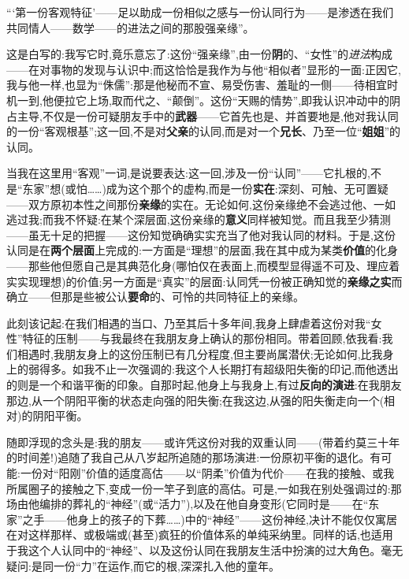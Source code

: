 “‘第一份客观特征’——足以助成一份相似之感与一份认同行为——是渗透在我们共同情人——数学——的进法之间的那股强亲缘”。

这是白写的:我写它时,竟乐意忘了:这份“强亲缘”,由一份\textbf{阴}的、“女性”的\emph{进法}构成——在对事物的发现与认识中;而这恰恰是我作为与他“相似者”显形的一面:正因它,我与他一样,也显为“侏儒”:那是他秘而不宣、易受伤害、羞耻的一侧——待相宜时机一到,他便拉它上场,取而代之、“颠倒”。这份“天赐的情势”,即我认识冲动中的阴占主导,不仅是一份可疑朋友手中的\textbf{武器}——它首先也是、并首要地是,他对我认同的一份“客观根基”;这一回,不是对\textbf{父亲}的认同,而是对一个\textbf{兄长}、乃至一位“\textbf{姐姐}”的认同。

当我在这里用“客观”一词,是说要表达:这一回,涉及一份“认同”——它扎根的,不是“东家”想(或怕……)成为这个那个的虚构,而是一份\textbf{实在}:深刻、可触、无可置疑——双方原初本性之间那份\textbf{亲缘}的实在。无论如何,这份亲缘绝不会逃过他、一如逃过我;而我不怀疑:在某个深层面,这份亲缘的\textbf{意义}同样被知觉。而且我至少猜测——虽无十足的把握——这份知觉确确实实充当了他对我认同的材料。于是,这份认同是在\textbf{两个层面}上完成的:一方面是“理想”的层面,我在其中成为某类\textbf{价值}的化身——那些他但愿自己是其典范化身(哪怕仅在表面上,而模型显得遥不可及、理应着实实现理想)的价值;另一方面是“真实”的层面:认同凭一份被正确知觉的\textbf{亲缘之实}而确立——但那是些被公认\textbf{要命}的、可怜的共同特征上的亲缘\dmark{}。

此刻该记起:在我们相遇的当口、乃至其后十多年间,我身上肆虐着这份对我“女性”特征的压制——与我最终在我朋友身上确认的那份相同。带着回顾,依我看:我们相遇时,我朋友身上的这份压制已有几分程度,但主要尚属潜伏;无论如何,比我身上的弱得多。如我不止一次强调的:我这个人长期打有超级阳失衡的印记,而他透出的则是一个和谐平衡的印象。自那时起,他身上与我身上,有过\textbf{反向的演进}:在我朋友那边,从一个阴阳平衡的状态走向强的阳失衡;在我这边,从强的阳失衡走向一个(相对)的阴阳平衡。

随即浮现的念头是:我的朋友——或许凭这份对我的双重认同——(带着约莫三十年的时间差!)追随了我自己从八岁起所追随的那场演进:一份原初平衡的退化。有可能:一份对“阳刚”价值的适度高估——以“阴柔”价值为代价——在我的接触、或我所属圈子的接触之下,变成一份一竿子到底的高估。可是,一如我在别处强调过的:那场由他编排的葬礼的“神经”(或“活力”),以及在他自身变形(它同时是——在“东家”之手——他身上的孩子的下葬……)中的“神经”——这份神经,决计不能仅仅寓居在对这样那样、或极端或(甚至)疯狂的价值体系的单纯采纳里。同样的话,也适用于我这个人认同中的“神经”、以及这份认同在我朋友生活中扮演的过大角色。毫无疑问:是同一份“力”在运作,而它的根,深深扎入他的童年。

